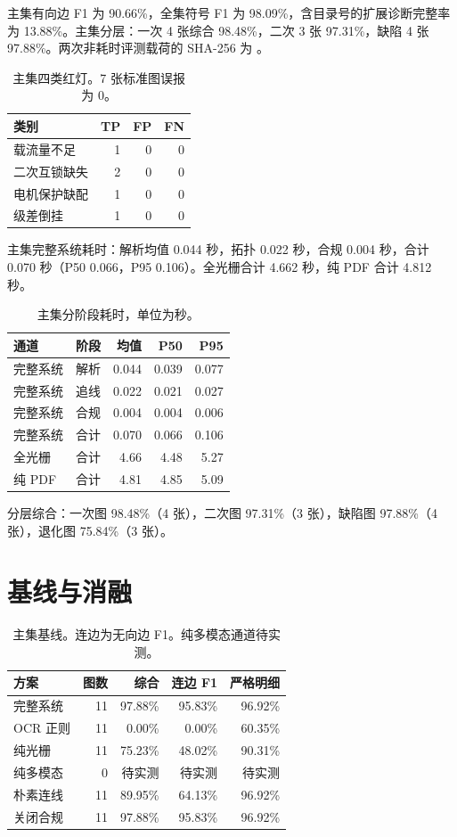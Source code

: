 主集有向边 F1 为 90.66\%，全集符号 F1 为 98.09\%，含目录号的扩展诊断完整率为 13.88\%。主集分层：一次 4 张综合 98.48\%，二次 3 张 97.31\%，缺陷 4 张 97.88\%。两次非耗时评测载荷的 SHA-256 为 。

\begin{table}[ht]
\centering
\caption{主集四类红灯。7 张标准图误报为 0。}
\begin{tabular}{lrrr}
\toprule
类别 & TP & FP & FN \\
\midrule
载流量不足 & 1 & 0 & 0 \\
二次互锁缺失 & 2 & 0 & 0 \\
电机保护缺配 & 1 & 0 & 0 \\
级差倒挂 & 1 & 0 & 0 \\
\bottomrule
\end{tabular}
\end{table}

主集完整系统耗时：解析均值 0.044 秒，拓扑 0.022 秒，合规 0.004 秒，合计 0.070 秒（P50 0.066，P95 0.106）。全光栅合计 4.662 秒，纯 PDF 合计 4.812 秒。

\begin{table}[ht]
\centering
\caption{主集分阶段耗时，单位为秒。}
\footnotesize
\begin{tabular}{llrrr}
\toprule
通道 & 阶段 & 均值 & P50 & P95 \\
\midrule
完整系统 & 解析 & 0.044 & 0.039 & 0.077 \\
完整系统 & 追线 & 0.022 & 0.021 & 0.027 \\
完整系统 & 合规 & 0.004 & 0.004 & 0.006 \\
完整系统 & 合计 & 0.070 & 0.066 & 0.106 \\
全光栅 & 合计 & 4.66 & 4.48 & 5.27 \\
纯 PDF & 合计 & 4.81 & 4.85 & 5.09 \\
\bottomrule
\end{tabular}
\end{table}

分层综合：一次图 98.48\%（4 张），二次图 97.31\%（3 张），缺陷图 97.88\%（4 张），退化图 75.84\%（3 张）。

\section{基线与消融}
\begin{table}[ht]
\centering
\caption{主集基线。连边为无向边 F1。纯多模态通道待实测。}
\begin{tabular}{lrrrr}
\toprule
方案 & 图数 & 综合 & 连边 F1 & 严格明细 \\
\midrule
完整系统 & 11 & 97.88\% & 95.83\% & 96.92\% \\
OCR 正则 & 11 & 0.00\% & 0.00\% & 60.35\% \\
纯光栅 & 11 & 75.23\% & 48.02\% & 90.31\% \\
纯多模态 & 0 & 待实测 & 待实测 & 待实测 \\
朴素连线 & 11 & 89.95\% & 64.13\% & 96.92\% \\
关闭合规 & 11 & 97.88\% & 95.83\% & 96.92\% \\
\bottomrule
\end{tabular}
\end{table}

